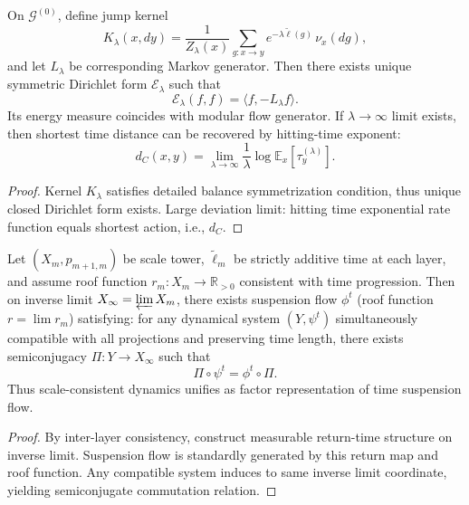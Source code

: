 \begin{theorem}\label{thm:xi-time-induced-dirichlet-form}
On \(\mathcal G^{(0)}\), define jump kernel
\[
K_\lambda(x,dy)
=
\frac{1}{Z_\lambda(x)}
\sum_{g:x\to y}
e^{-\lambda\widetilde\ell(g)}\,\nu_x(dg),
\]
and let \(L_\lambda\) be corresponding Markov generator.
Then there exists unique symmetric Dirichlet form \(\mathcal E_\lambda\) such that
\[
\mathcal E_\lambda(f,f)=\langle f,-L_\lambda f\rangle.
\]
Its energy measure coincides with modular flow generator.
If \(\lambda\to\infty\) limit exists, then shortest time distance can be recovered by hitting-time exponent:
\[
d_C(x,y)
=
\lim_{\lambda\to\infty}
\frac{1}{\lambda}\log\mathbb E_x[\tau_y^{(\lambda)}].
\]
\end{theorem}

\begin{proof}
Kernel \(K_\lambda\) satisfies detailed balance symmetrization condition, thus unique closed Dirichlet form exists.
Large deviation limit: hitting time exponential rate function equals shortest action, i.e., \(d_C\).
\end{proof}

\begin{theorem}\label{thm:xi-suspension-flow-universality}
Let \((X_m,p_{m+1,m})\) be scale tower, \(\widetilde\ell_m\) be strictly additive time at each layer, and assume roof function \(r_m:X_m\to\mathbb R_{>0}\) consistent with time progression.
Then on inverse limit \(X_\infty=\varprojlim X_m\), there exists suspension flow \(\phi^t\) (roof function \(r=\lim r_m\)) satisfying:
for any dynamical system \((Y,\psi^t)\) simultaneously compatible with all projections and preserving time length, there exists semiconjugacy \(\Pi:Y\to X_\infty\) such that
\[
\Pi\circ\psi^t=\phi^t\circ\Pi.
\]
Thus scale-consistent dynamics unifies as factor representation of time suspension flow.
\end{theorem}

\begin{proof}
By inter-layer consistency, construct measurable return-time structure on inverse limit.
Suspension flow is standardly generated by this return map and roof function.
Any compatible system induces to same inverse limit coordinate, yielding semiconjugate commutation relation.
\end{proof}

